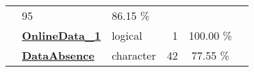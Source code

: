 \documentclass[]{article}
\begin{document}
\begin{longtable}[]{@{}lllrcl@{}}
\begin{minipage}[t]{0.11\columnwidth}
\end{minipage} & \begin{minipage}[t]{0.10\columnwidth}\raggedleft\strut
95\strut
\end{minipage} & \begin{minipage}[t]{0.10\columnwidth}\centering\strut
86.15 \%\strut
\end{minipage} & \begin{minipage}[t]{0.12\columnwidth}\raggedright\strut
\strut
\end{minipage}\tabularnewline
\begin{minipage}[t]{0.07\columnwidth}\raggedright\strut
\strut
\end{minipage} & \begin{minipage}[t]{0.35\columnwidth}\raggedright\strut
\textbf{\protect\hyperlink{onlinedata_1}{OnlineData\_1}}\strut
\end{minipage} & \begin{minipage}[t]{0.11\columnwidth}\raggedright\strut
logical\strut
\end{minipage} & \begin{minipage}[t]{0.10\columnwidth}\raggedleft\strut
1\strut
\end{minipage} & \begin{minipage}[t]{0.10\columnwidth}\centering\strut
100.00 \%\strut
\end{minipage} & \begin{minipage}[t]{0.12\columnwidth}\raggedright\strut
\strut
\end{minipage}\tabularnewline
\begin{minipage}[t]{0.07\columnwidth}\raggedright\strut
\strut
\end{minipage} & \begin{minipage}[t]{0.35\columnwidth}\raggedright\strut
\textbf{\protect\hyperlink{dataabsence}{DataAbsence}}\strut
\end{minipage} & \begin{minipage}[t]{0.11\columnwidth}\raggedright\strut
character\strut
\end{minipage} & \begin{minipage}[t]{0.10\columnwidth}\raggedleft\strut
42\strut
\end{minipage} & \begin{minipage}[t]{0.10\columnwidth}\centering\strut
77.55 \%\strut
\end{minipage} & \begin{minipage}[t]{0.12\columnwidth}\raggedright\strut
\strut
\end{minipage}\tabularnewline

\end{longtable}
\end{document}
